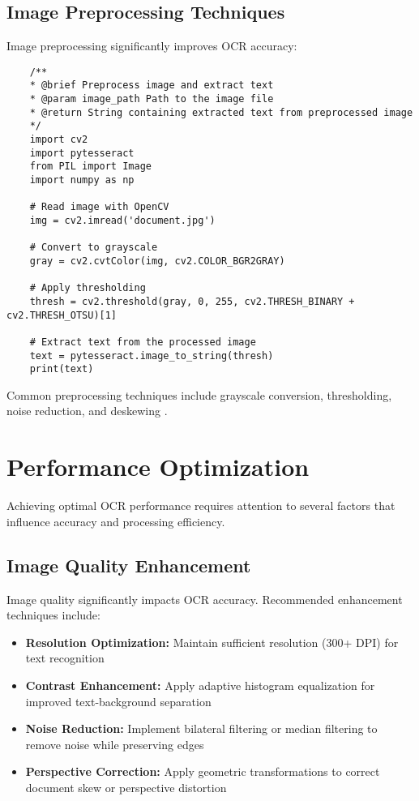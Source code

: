 \subsection{Image Preprocessing Techniques}
\label{subsec:preprocessing}

Image preprocessing significantly improves OCR accuracy:

\begin{verbatim}
	/**
	* @brief Preprocess image and extract text
	* @param image_path Path to the image file
	* @return String containing extracted text from preprocessed image
	*/
	import cv2
	import pytesseract
	from PIL import Image
	import numpy as np
	
	# Read image with OpenCV
	img = cv2.imread('document.jpg')
	
	# Convert to grayscale
	gray = cv2.cvtColor(img, cv2.COLOR_BGR2GRAY)
	
	# Apply thresholding
	thresh = cv2.threshold(gray, 0, 255, cv2.THRESH_BINARY + cv2.THRESH_OTSU)[1]
	
	# Extract text from the processed image
	text = pytesseract.image_to_string(thresh)
	print(text)
\end{verbatim}

Common preprocessing techniques include grayscale conversion, thresholding, noise reduction, and deskewing \cite{DataCamp:2024}.

\section{Performance Optimization}
\label{sec:optimization}

Achieving optimal OCR performance requires attention to several factors that influence accuracy and processing efficiency.

\subsection{Image Quality Enhancement}
\label{subsec:image_quality}

Image quality significantly impacts OCR accuracy. Recommended enhancement techniques include:

\begin{itemize}
	\item \textbf{Resolution Optimization:} Maintain sufficient resolution (300+ DPI) for text recognition
	\item \textbf{Contrast Enhancement:} Apply adaptive histogram equalization for improved text-background separation
	\item \textbf{Noise Reduction:} Implement bilateral filtering or median filtering to remove noise while preserving edges
	\item \textbf{Perspective Correction:} Apply geometric transformations to correct document skew or perspective distortion
\end{itemize}

